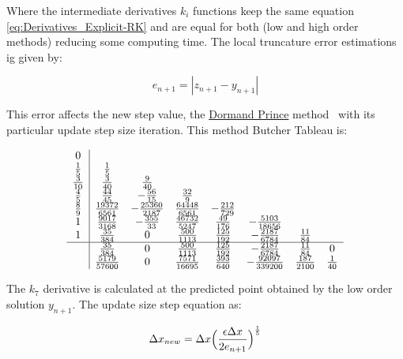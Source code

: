 Where the intermediate derivatives \(k_i\) functions keep the same equation \eqref{eq:Derivatives_Explicit-RK} and are equal for both (low and high order methods) reducing some computing time. The local truncature error estimations ig given by:

\begin{equation}
    e_{n+1} = |z_{n+1} - y_{n+1}|
    \label{eq:Local_Truncature_Erro_Estimation_AdaptiveRK}
\end{equation}

This error affects the new step value, the \underline{Dormand Prince} method~\cite{kimura2009dormand} with its particular update step size iteration. This method Butcher Tableau is:

\begin{equation}
    \begin{array}{c|ccccccc}
        0\\
        \frac{1}{5} & \frac{1}{5}\\
        \frac{3}{10} & \frac{3}{40} & \frac{9}{40} \\
        \frac{4}{5} & \frac{44}{45} & -\frac{56}{15} & \frac{32}{9}\\
        \frac{8}{9} & \frac{19372}{6561} & -\frac{25360}{2187} & \frac{64448}{6561} & -\frac{212}{729}\\
        1 & \frac{9017}{3168} & -\frac{355}{33} & \frac{46732}{5247} & \frac{49}{176} & -\frac{5103}{18656}\\
        1 & \frac{35}{384} & 0 & \frac{500}{1113} & \frac{125}{192} & -\frac{2187}{6784} & \frac{11}{84}\\
        \hline
        & \frac{35}{384} & 0 & \frac{500}{1113} & \frac{125}{192} & -\frac{2187}{6784} & \frac{11}{84} & 0  \\
        & \frac{5179}{57600} & 0 & \frac{7571}{16695} & \frac{393}{640} & -\frac{92097}{339200} & \frac{187}{2100} & \frac{1}{40}  
    \end{array}
    \label{eq:Dormand-Prince_Tableu}
\end{equation}

The \(k_7\) derivative is calculated at the predicted point obtained by the low order solution \(y_{n+1}\). The update size step equation as:

\begin{equation}
    \Delta x_{new} = \Delta x \Bigl( \frac{\epsilon\Delta x}{2e_{n+1}}\Bigr)^{\frac{1}{5}}
    \label{eq:Update_Size_Step_Equation}
\end{equation}

